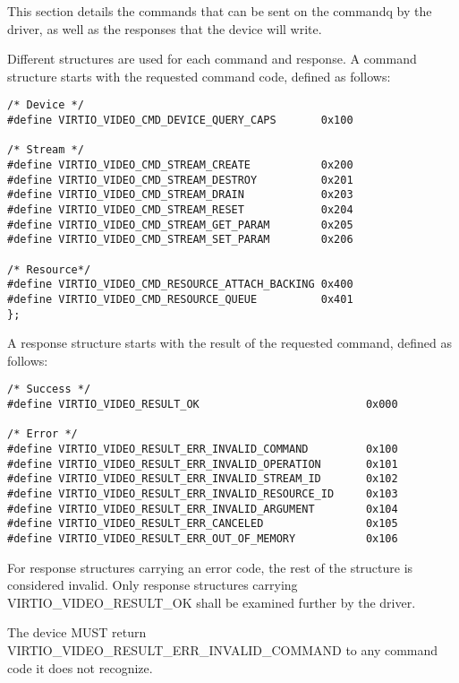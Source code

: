 This section details the commands that can be sent on the commandq by
the driver, as well as the responses that the device will write.

Different structures are used for each command and response. A command
structure starts with the requested command code, defined as follows:

\begin{lstlisting}
/* Device */
#define VIRTIO_VIDEO_CMD_DEVICE_QUERY_CAPS       0x100

/* Stream */
#define VIRTIO_VIDEO_CMD_STREAM_CREATE           0x200
#define VIRTIO_VIDEO_CMD_STREAM_DESTROY          0x201
#define VIRTIO_VIDEO_CMD_STREAM_DRAIN            0x203
#define VIRTIO_VIDEO_CMD_STREAM_RESET            0x204
#define VIRTIO_VIDEO_CMD_STREAM_GET_PARAM        0x205
#define VIRTIO_VIDEO_CMD_STREAM_SET_PARAM        0x206

/* Resource*/
#define VIRTIO_VIDEO_CMD_RESOURCE_ATTACH_BACKING 0x400
#define VIRTIO_VIDEO_CMD_RESOURCE_QUEUE          0x401
};
\end{lstlisting}

A response structure starts with the result of the requested command,
defined as follows:

\begin{lstlisting}
/* Success */
#define VIRTIO_VIDEO_RESULT_OK                          0x000

/* Error */
#define VIRTIO_VIDEO_RESULT_ERR_INVALID_COMMAND         0x100
#define VIRTIO_VIDEO_RESULT_ERR_INVALID_OPERATION       0x101
#define VIRTIO_VIDEO_RESULT_ERR_INVALID_STREAM_ID       0x102
#define VIRTIO_VIDEO_RESULT_ERR_INVALID_RESOURCE_ID     0x103
#define VIRTIO_VIDEO_RESULT_ERR_INVALID_ARGUMENT        0x104
#define VIRTIO_VIDEO_RESULT_ERR_CANCELED                0x105
#define VIRTIO_VIDEO_RESULT_ERR_OUT_OF_MEMORY           0x106
\end{lstlisting}

For response structures carrying an error code, the rest of the
structure is considered invalid. Only response structures carrying
VIRTIO\_VIDEO\_RESULT\_OK shall be examined further by the driver.


The device MUST return VIRTIO\_VIDEO\_RESULT\_ERR\_INVALID\_COMMAND to
any command code it does not recognize.

